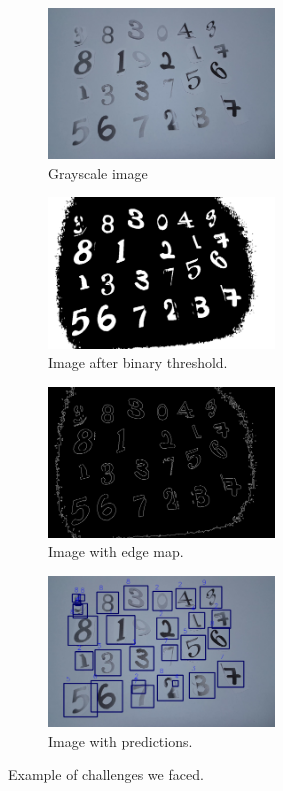 \documentclass[12pt, letterpaper]{article}
\begin{document}
\begin{figure}[!h]
\begin{center}
\begin{subfigure}{0.47\textwidth}
\centering
\includegraphics*[width=0.95 \textwidth, height=4cm]{chalorig.png}
\caption{Grayscale image}
\end{subfigure}
\begin{subfigure}{0.47\textwidth}
\centering
\includegraphics*[width=0.95 \textwidth, height=4cm]{chalthresh.png}
\caption{Image after binary threshold.}
\end{subfigure}

\begin{subfigure}{0.47\textwidth}
\centering
\includegraphics*[width=0.95 \textwidth, height=4cm]{chaledge.png}
\caption{Image with edge map.}
\end{subfigure}
\begin{subfigure}{0.47\textwidth}
\centering
\includegraphics*[width=0.95 \textwidth, height=4cm]{chalbbox.png}
\caption{Image with predictions.}
\end{subfigure}
\end{center}
\caption{Example of challenges we faced.}
\label{fig:chal}
\end{figure}
\end{document}
